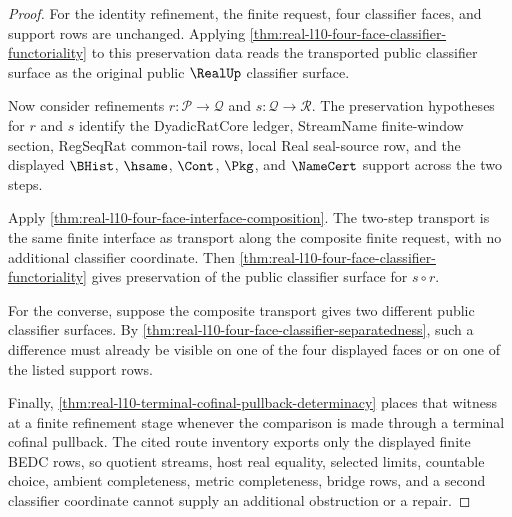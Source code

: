 \begin{proof}
For the identity refinement, the finite request, four classifier faces, and support rows are unchanged. Applying \autoref{thm:real-l10-four-face-classifier-functoriality} to this preservation data reads the transported public classifier surface as the original public $\RealUp$ classifier surface.

Now consider refinements $r : \mathcal P \to \mathcal Q$ and $s : \mathcal Q \to \mathcal R$. The preservation hypotheses for $r$ and $s$ identify the DyadicRatCore ledger, StreamName finite-window section, RegSeqRat common-tail rows, local Real seal-source row, and the displayed $\BHist$, $\hsame$, $\Cont$, $\Pkg$, and $\NameCert$ support across the two steps.

Apply \autoref{thm:real-l10-four-face-interface-composition}. The two-step transport is the same finite interface as transport along the composite finite request, with no additional classifier coordinate. Then \autoref{thm:real-l10-four-face-classifier-functoriality} gives preservation of the public classifier surface for $s \circ r$.

For the converse, suppose the composite transport gives two different public classifier surfaces. By \autoref{thm:real-l10-four-face-classifier-separatedness}, such a difference must already be visible on one of the four displayed faces or on one of the listed support rows.

Finally, \autoref{thm:real-l10-terminal-cofinal-pullback-determinacy} places that witness at a finite refinement stage whenever the comparison is made through a terminal cofinal pullback. The cited route inventory exports only the displayed finite BEDC rows, so quotient streams, host real equality, selected limits, countable choice, ambient completeness, metric completeness, bridge rows, and a second classifier coordinate cannot supply an additional obstruction or a repair.
\end{proof}
